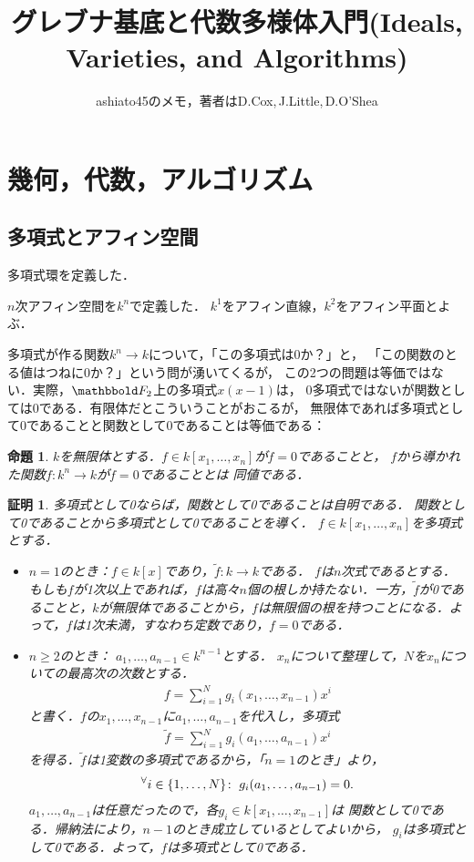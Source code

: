 \documentclass[9pt]{ltjsarticle}
\title{グレブナ基底と代数多様体入門(Ideals, Varieties, and Algorithms)}
\author{ashiato45のメモ，著者はD.Cox,\,J.Little,\,D.O'Shea}
\theoremstyle{break}
\theoremstyle{break}
\newtheorem{myproposition}[Proposition]{命題}
\theoremstyle{break}
\theoremstyle{break}
\theoremstyle{break}
\theoremstyle{break}
\theoremstyle{break}
\theoremstyle{break}
\theoremstyle{break}
\theoremstyle{break}
\theoremstyle{break}
\theoremstyle{break}
\theoremstyle{break}
\theoremstyle{break}
\theoremstyle{break}
\theoremstyle{nonumberbreak}
\newtheorem{myproof}{証明}
\theoremstyle{nonumberbreak}
\begin{document}
\maketitle

\section{幾何，代数，アルゴリズム}
\subsection{多項式とアフィン空間}

多項式環を定義した．

$n$次アフィン空間を$k^n$で定義した．
$k^1$をアフィン直線，$k^2$をアフィン平面とよぶ．

多項式が作る関数$k^n \to k$について，「この多項式は0か？」と，
「この関数のとる値はつねに0か？」という問が湧いてくるが，
この2つの問題は等価ではない．実際，$\F_2$上の多項式$x(x-1)$は，
0多項式ではないが関数としては0である．有限体だとこういうことがおこるが，
無限体であれば多項式として0であることと関数として0であることは等価である：
\begin{myproposition}
 $k$を無限体とする．$f\in k[x_1,\dots,x_n]$が$f=0$であることと，
 $f$から導かれた関数$f \colon k^n \to k$が$f = 0$であることとは
同値である．
\end{myproposition}
\begin{myproof}
 多項式として0ならば，関数として0であることは自明である．
関数として0であることから多項式として0であることを導く．
$f\in k[x_1,\dots,x_n]$を多項式とする．
\begin{itemize}
 \item $n=1$のとき：$f\in k[x]$であり，$\tilde f\colon k\to k$である．
$f$は$n$次式であるとする．もしも$f$が1次以上であれば，$f$は高々$n$個の根しか持たない．一方，$\tilde f$が0であることと，$k$が無限体であることから，$f$は無限個の根を持つことになる．よって，$f$は1次未満，すなわち定数であり，$f=0$である．
 \item $n\ge 2$のとき：
$a_1,\dots,a_{n-1}\in k^{n-1}$とする．
$x_n$について整理して，$N$を$x_n$についての最高次の次数とする．
\begin{align}
 f = \sum_{i=1}^N g_i(x_1,\dots,x_{n-1})x^i
\end{align}
と書く．$f$の$x_1,\dots,x_{n-1}$に$a_1,\dots,a_{n-1}$を代入し，多項式
\begin{align}
 \tilde f = \sum_{i=1}^N g_i(a_1,\dots,a_{n-1})x^i
\end{align}
を得る．$\tilde f$は1変数の多項式であるから，「$n=1$のとき」より，
\begin{align}
 {}^{\forall}{i \in \left\{1,\dots,N\right\}}\mathrm{\colon\;} g_i(a_1,\dots,a_{n-1})  = 0.
\end{align}
$a_1,\dots,a_{n-1}$は任意だったので，各$g_i \in k[x_1,\dots,x_{n-1}]$は
関数として0である．帰納法により，$n-1$のとき成立しているとしてよいから，
$g_i$は多項式として0である．よって，$f$は多項式として0である．
\end{itemize}
\end{myproof}
\end{document}
